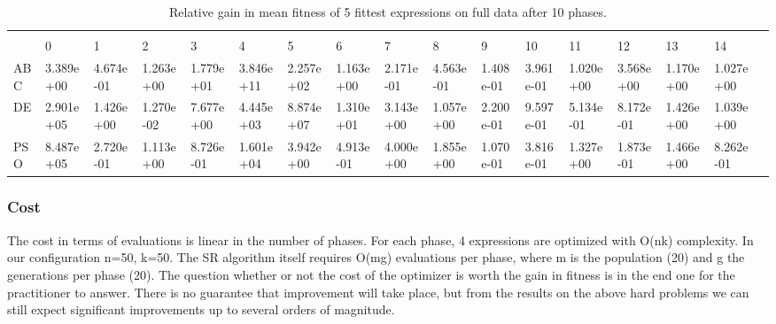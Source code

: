 \begin{landscape}
\begin{table}[]
\centering
\caption{Relative gain in mean fitness of 5 fittest expressions on full data after 10 phases.}
\label{table:10phasemeanfull}
\begin{adjustbox}{width=1.7\textwidth}
\begin{tabular}{lllllllllllllllll}
     &           &           &           &           &           &           &           &           &           &           &           &           &           &           &           &  \\
     & 0         & 1         & 2         & 3         & 4         & 5         & 6         & 7         & 8         & 9         & 10        & 11        & 12        & 13        & 14        &  \\
ABC                 & 3.389e+00 & 4.674e-01 & 1.263e+00 & 1.779e+01 & 3.846e+11 & 2.257e+02 & 1.163e+00 & 2.171e-01 & 4.563e-01 & 1.408e-01 & 3.961e-01 & 1.020e+00 & 3.568e+00 & 1.170e+00 & 1.027e+00 &  \\
DE                  & 2.901e+05 & 1.426e+00 & 1.270e-02 & 7.677e+00 & 4.445e+03 & 8.874e+07 & 1.310e+01 & 3.143e+00 & 1.057e+00 & 2.200e-01 & 9.597e-01 & 5.134e-01 & 8.172e-01 & 1.426e+00 & 1.039e+00 &  \\
PSO                 & 8.487e+05 & 2.720e-01 & 1.113e+00 & 8.726e-01 & 1.601e+04 & 3.942e+00 & 4.913e-01 & 4.000e+00 & 1.855e+00 & 1.070e-01 & 3.816e-01 & 1.327e+00 & 1.873e-01 & 1.466e+00 & 8.262e-01 & 
\end{tabular}
\end{adjustbox}
\end{table}
\end{landscape}

\subsubsection{Cost}
The cost in terms of evaluations is linear in the number of phases. For each phase, 4 expressions are optimized with O(nk) complexity. In our configuration n=50, k=50. The SR algorithm itself requires O(mg) evaluations per phase, where m is the population (20) and g the generations per phase (20). The question whether or not the cost of the optimizer is worth the gain in fitness is in the end one for the practitioner to answer. There is no guarantee that improvement will take place, but from the results on the above hard problems we can still expect significant improvements up to several orders of magnitude. 

